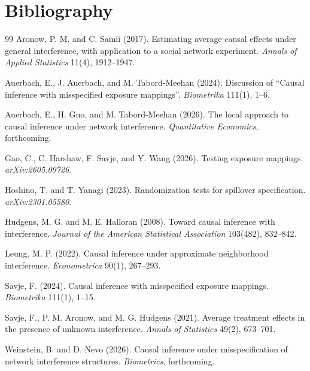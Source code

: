 \documentclass[11pt]{article}
\theoremstyle{definition}
\theoremstyle{plain}
\theoremstyle{remark}
\begin{document}
\section*{Bibliography}
\begin{thebibliography}{99}
Aronow, P. M. and C. Samii (2017).
Estimating average causal effects under general interference, with application to a social network experiment.
\textit{Annals of Applied Statistics} 11(4), 1912--1947.

Auerbach, E., J. Auerbach, and M. Tabord-Meehan (2024).
Discussion of ``Causal inference with misspecified exposure mappings''.
\textit{Biometrika} 111(1), 1--6.

Auerbach, E., H. Guo, and M. Tabord-Meehan (2026).
The local approach to causal inference under network interference.
\textit{Quantitative Economics}, forthcoming.

Gao, C., C. Harshaw, F. Savje, and Y. Wang (2026).
Testing exposure mappings.
\textit{arXiv:2605.09726}.

Hoshino, T. and T. Yanagi (2023).
Randomization tests for spillover specification.
\textit{arXiv:2301.05580}.

Hudgens, M. G. and M. E. Halloran (2008).
Toward causal inference with interference.
\textit{Journal of the American Statistical Association} 103(482), 832--842.

Leung, M. P. (2022).
Causal inference under approximate neighborhood interference.
\textit{Econometrica} 90(1), 267--293.

Savje, F. (2024).
Causal inference with misspecified exposure mappings.
\textit{Biometrika} 111(1), 1--15.

Savje, F., P. M. Aronow, and M. G. Hudgens (2021).
Average treatment effects in the presence of unknown interference.
\textit{Annals of Statistics} 49(2), 673--701.

Weinstein, B. and D. Nevo (2026).
Causal inference under misspecification of network interference structures.
\textit{Biometrics}, forthcoming.
\end{thebibliography}
\end{document}
